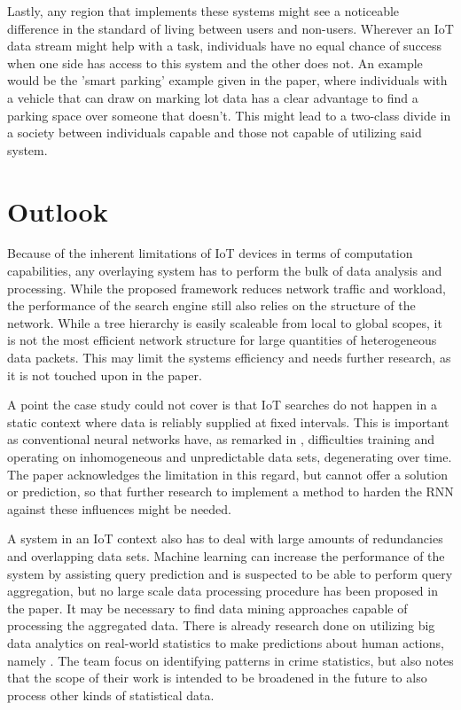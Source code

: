 \documentclass [journal]{IEEEtran}
\begin{document}
Lastly, any region that implements these systems might see a noticeable difference in the standard of living between users and non-users. Wherever an IoT data stream might help with a task, individuals have no equal chance of success when one side has access to this system and the other does not. An example would be the 'smart parking' example given in the paper, where individuals with a vehicle that can draw on marking lot data has a clear advantage to find a parking space over someone that doesn't. This might lead to a two-class divide in a society between individuals capable and those not capable of utilizing said system.



 \section{Outlook}
Because of the inherent limitations of IoT devices in terms of computation capabilities, any overlaying system has to perform the bulk of data analysis and processing. While the proposed framework reduces network traffic and workload, the performance of the search engine still also relies on the structure of the network. While a tree hierarchy is easily scaleable from local to global scopes, it is not the most efficient network structure for large quantities of heterogeneous data packets. This may limit the systems efficiency and needs further research, as it is not touched upon in the paper. \par
A point the case study could not cover is that IoT searches do not happen in a static context where data is reliably supplied at fixed intervals. This is important as conventional neural networks have, as remarked in \cite{RNNrandom}, difficulties training and operating on inhomogeneous and unpredictable data sets, degenerating over time. The paper acknowledges the limitation in this regard, but cannot offer a solution or prediction, so that further research to implement a method to harden the RNN against these influences might be needed. \par
A system in an IoT context also has to deal with large amounts of redundancies and overlapping data sets. Machine learning can increase the performance of the system by assisting query prediction and is suspected to be able to perform query aggregation, but no large scale data processing procedure has been proposed in the paper. It may be necessary to find data mining approaches capable of processing the aggregated data. There is already research done on utilizing big data analytics on real-world statistics to make predictions about human actions, namely \cite{crime}. The team focus on identifying patterns in crime statistics, but also notes that the scope of their work is intended to be broadened in the future to also process other kinds of statistical data. \par
\end{document}
